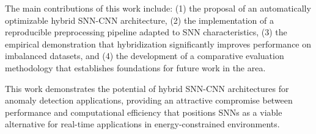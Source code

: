The main contributions of this work include: (1) the proposal of an automatically optimizable hybrid SNN-CNN architecture, (2) the implementation of a reproducible preprocessing pipeline adapted to SNN characteristics, (3) the empirical demonstration that hybridization significantly improves performance on imbalanced datasets, and (4) the development of a comparative evaluation methodology that establishes foundations for future work in the area.


This work demonstrates the potential of hybrid SNN-CNN architectures for anomaly detection applications, providing an attractive compromise between performance and computational efficiency that positions SNNs as a viable alternative for real-time applications in energy-constrained environments.